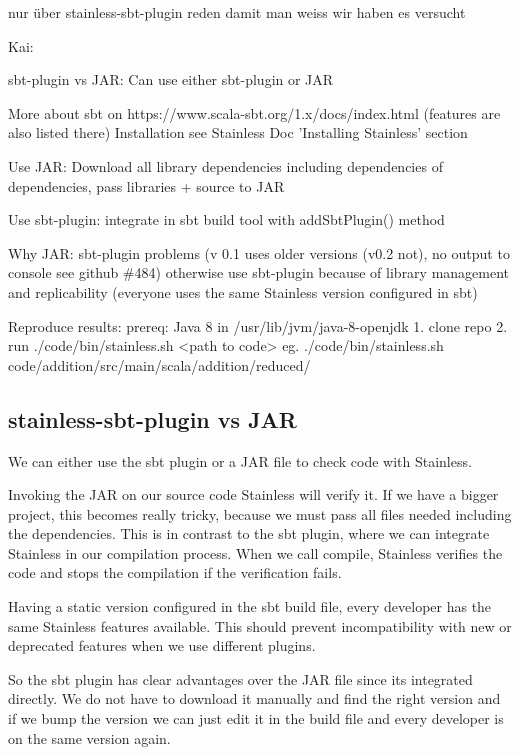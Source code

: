 \documentclass[runningheads]{llncs}
\newcommand{\todo}[1]{{\par \color{red}#1}}
\begin{document}
\todo{nur über stainless-sbt-plugin reden damit man weiss wir haben es versucht}


\todo{
Kai:

sbt-plugin vs JAR:
Can use either sbt-plugin or JAR

More about sbt on https://www.scala-sbt.org/1.x/docs/index.html (features are also listed there)
Installation see Stainless Doc 'Installing Stainless' section

Use JAR:
Download all library dependencies including dependencies of dependencies, pass libraries + source to JAR
  
Use sbt-plugin: integrate in sbt build tool with addSbtPlugin() method

Why JAR:
sbt-plugin problems (v 0.1 uses older versions (v0.2 not), no output to console see github \#484)
otherwise use sbt-plugin because of library management and replicability (everyone uses the same Stainless version configured in sbt)

Reproduce results:
prereq: Java 8 in /usr/lib/jvm/java-8-openjdk
1. clone repo
2. run ./code/bin/stainless.sh <path to code>
   eg. ./code/bin/stainless.sh code/addition/src/main/scala/addition/reduced/
}



\subsection{stainless-sbt-plugin vs JAR}

We can either use the sbt plugin or a JAR file to check code with Stainless.

Invoking the JAR on our source code Stainless will verify it.  If we
have a bigger project, this becomes really tricky, because we must
pass all files needed including the dependencies.  This is in contrast
to the sbt plugin, where we can integrate Stainless in our compilation
process.  When we call compile, Stainless verifies the code and stops
the compilation if the verification fails.

Having a static version configured in the sbt build file, every
developer has the same Stainless features available.  This should
prevent incompatibility with new or deprecated features when we use
different plugins.

So the sbt plugin has clear advantages over the JAR file since its
integrated directly.  We do not have to download it manually and find
the right version and if we bump the version we can just edit it in
the build file and every developer is on the same version again.
\end{document}
